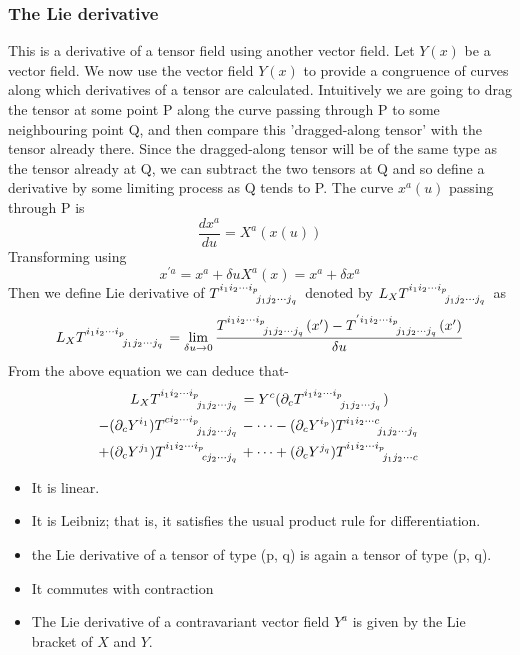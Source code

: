 \documentclass[12pt,a4paper]{article}
\numberwithin{table}{section}
\numberwithin{figure}{section}
\numberwithin{equation}{section}
\theoremstyle{remark}
\theoremstyle{definition}
\begin{document}
\subsubsection{The Lie derivative}
This is a derivative of a tensor field using another vector field. Let $Y(x)$ be a vector field. We now use the vector field $Y(x)$ to provide a congruence of curves along which derivatives of a tensor are calculated. Intuitively we are going to drag the tensor at some point P along the curve passing through P to some neighbouring point Q, and then compare this 'dragged-along tensor' with the tensor already there. Since the dragged-along tensor will be of the same type as the tensor already at Q, we can subtract the two tensors at Q and so define a derivative by some limiting process as Q tends to P. The curve $x^a(u)$ passing through P is
$$\dfrac{dx^a}{du}=X^a(x(u))$$
Transforming using
$$x^{'a}=x^a+\delta uX^a(x)=x^a+\delta x^a$$
Then we define Lie derivative of $\tensor{T}{^{i_1i_2\cdots i_p}_{j_1j_2\cdots j_q }}$ denoted by $L_X \tensor{T}{^{i_1i_2\cdots i_p}_{j_1j_2\cdots j_q }}$ as
$$L_X \tensor{T}{^{i_1i_2\cdots i_p}_{j_1j_2\cdots j_q }}=\lim_{\delta u\to 0} \dfrac{\tensor{T}{^{i_1i_2\cdots i_p}_{j_1j_2\cdots j_q }}(x')-\tensor{T}{^{'i_1i_2\cdots i_p}_{j_1j_2\cdots j_q }}(x')}{\delta u}$$
From the above equation we can deduce that-
\begin{multline*}
L_X \tensor{T}{^{i_1i_2\cdots i_p}_{j_1j_2\cdots j_q}} =Y^c(\partial_c\tensor{T}{^{i_1i_2\cdots i_p}_{j_1j_2\cdots j_q }})\\-(\partial_c Y^{i_1})\tensor{T}{^{ci_2\cdots i_p}_{j_1j_2\cdots j_q}}-\cdots- (\partial_c Y^{i_p})\tensor{T}{^{i_1i_2\cdots c}_{j_1j_2\cdots j_q}}\\+(\partial_c Y^{j_1})\tensor{T}{^{i_1i_2\cdots i_p}_{cj_2\cdots j_q}}+ \cdots +(\partial_c Y^{j_q})\tensor{T}{^{i_1i_2\cdots i_p}_{j_1j_2\cdots c}}
\end{multline*}
\begin{itemize}
    \item It is linear.
    \item It is Leibniz; that is, it satisfies the usual product rule for differentiation.
    \item the Lie derivative of a tensor of type (p, q) is again a tensor of type (p, q).
    \item It commutes with contraction
    \item The Lie derivative of a contravariant vector field $Y^a$ is given by the Lie bracket of $X$ and $Y$.
\end{itemize}
\end{document}
